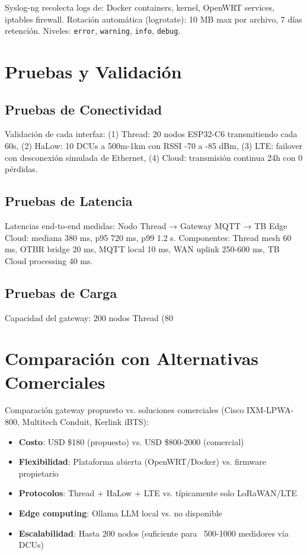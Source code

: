 Syslog-ng recolecta logs de: Docker containers, kernel, OpenWRT services, iptables firewall. Rotación automática (logrotate): 10 MB max por archivo, 7 días retención. Niveles: \texttt{error}, \texttt{warning}, \texttt{info}, \texttt{debug}.

\section{Pruebas y Validación}

\subsection{Pruebas de Conectividad}

Validación de cada interfaz: (1) Thread: 20 nodos ESP32-C6 transmitiendo cada 60s, (2) HaLow: 10 DCUs a 500m-1km con RSSI -70 a -85 dBm, (3) LTE: failover con desconexión simulada de Ethernet, (4) Cloud: transmisión continua 24h con 0 pérdidas.

\subsection{Pruebas de Latencia}

Latencias end-to-end medidas: Nodo Thread → Gateway MQTT → TB Edge Cloud: mediana 380 ms, p95 720 ms, p99 1.2 s. Componentes: Thread mesh 60 ms, OTBR bridge 20 ms, MQTT local 10 ms, WAN uplink 250-600 ms, TB Cloud processing 40 ms.

\subsection{Pruebas de Carga}

Capacidad del gateway: 200 nodos Thread (80%

\section{Comparación con Alternativas Comerciales}

Comparación gateway propuesto vs. soluciones comerciales (Cisco IXM-LPWA-800, Multitech Conduit, Kerlink iBTS):

\begin{itemize}
    \item \textbf{Costo}: USD \$180 (propuesto) vs. USD \$800-2000 (comercial)
    \item \textbf{Flexibilidad}: Plataforma abierta (OpenWRT/Docker) vs. firmware propietario
    \item \textbf{Protocolos}: Thread + HaLow + LTE vs. típicamente solo LoRaWAN/LTE
    \item \textbf{Edge computing}: Ollama LLM local vs. no disponible
    \item \textbf{Escalabilidad}: Hasta 200 nodos (suficiente para ~500-1000 medidores vía DCUs)
\end{itemize}

